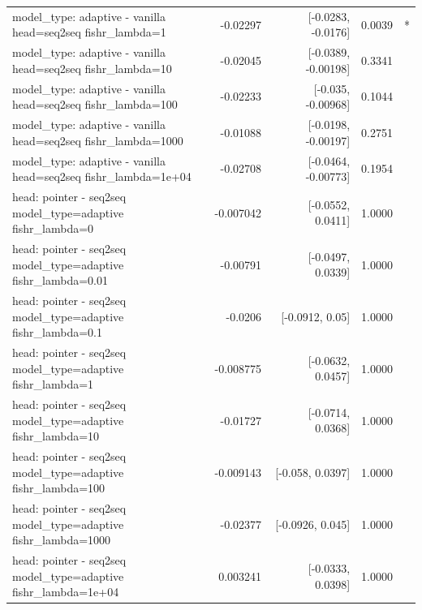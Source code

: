 \documentclass[10pt]{article}
\makeatletter
\newcommand{\stackcell}[1]{\begin{tabular}[t]{@{}l@{}}#1\end{tabular}}
\makeatother
\begin{document}
{\begin{longtable}{lrrrl}
\stackcell{model\_type: adaptive - vanilla\\\footnotesize head=seq2seq fishr\_lambda=1 } & -0.02297 & [-0.0283, -0.0176] & 0.0039 & *\\
\stackcell{model\_type: adaptive - vanilla\\\footnotesize head=seq2seq fishr\_lambda=10 } & -0.02045 & [-0.0389, -0.00198] & 0.3341 & \\
\stackcell{model\_type: adaptive - vanilla\\\footnotesize head=seq2seq fishr\_lambda=100 } & -0.02233 & [-0.035, -0.00968] & 0.1044 & \\
\stackcell{model\_type: adaptive - vanilla\\\footnotesize head=seq2seq fishr\_lambda=1000 } & -0.01088 & [-0.0198, -0.00197] & 0.2751 & \\
\stackcell{model\_type: adaptive - vanilla\\\footnotesize head=seq2seq fishr\_lambda=1e+04 } & -0.02708 & [-0.0464, -0.00773] & 0.1954 & \\
\stackcell{head: pointer - seq2seq\\\footnotesize model\_type=adaptive fishr\_lambda=0 } & -0.007042 & [-0.0552, 0.0411] & 1.0000 & \\
\stackcell{head: pointer - seq2seq\\\footnotesize model\_type=adaptive fishr\_lambda=0.01 } & -0.00791 & [-0.0497, 0.0339] & 1.0000 & \\
\stackcell{head: pointer - seq2seq\\\footnotesize model\_type=adaptive fishr\_lambda=0.1 } & -0.0206 & [-0.0912, 0.05] & 1.0000 & \\
\stackcell{head: pointer - seq2seq\\\footnotesize model\_type=adaptive fishr\_lambda=1 } & -0.008775 & [-0.0632, 0.0457] & 1.0000 & \\
\stackcell{head: pointer - seq2seq\\\footnotesize model\_type=adaptive fishr\_lambda=10 } & -0.01727 & [-0.0714, 0.0368] & 1.0000 & \\
\stackcell{head: pointer - seq2seq\\\footnotesize model\_type=adaptive fishr\_lambda=100 } & -0.009143 & [-0.058, 0.0397] & 1.0000 & \\
\stackcell{head: pointer - seq2seq\\\footnotesize model\_type=adaptive fishr\_lambda=1000 } & -0.02377 & [-0.0926, 0.045] & 1.0000 & \\
\stackcell{head: pointer - seq2seq\\\footnotesize model\_type=adaptive fishr\_lambda=1e+04 } & 0.003241 & [-0.0333, 0.0398] & 1.0000 & \\

\end{longtable}}
\end{document}
